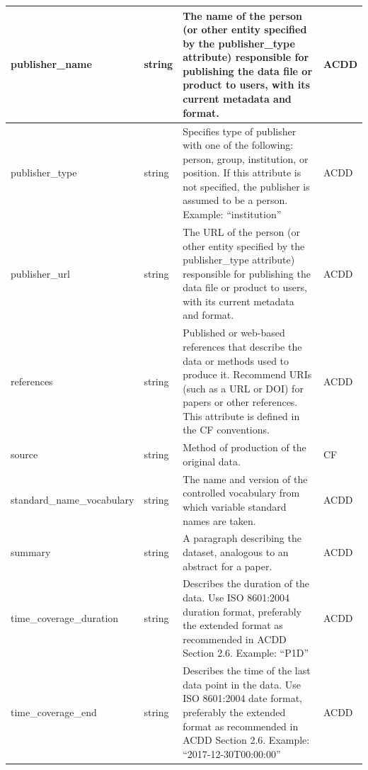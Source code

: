 \begin{longtable}{|p{}|p{}|p{}|p{}|}
\rowcolor{cyan!25} 
publisher\_name & string & The name of the person (or other entity specified by the publisher\_type attribute) responsible for publishing the data file or product to users, with its current metadata and format. & ACDD \\ \hline

\rowcolor{cyan!25} 
publisher\_type & string & Specifies type of publisher with one of the following: person, group, institution, or position. If this attribute is not specified, the publisher is assumed to be a person.  Example: “institution” & ACDD \\ \hline

\rowcolor{cyan!25} 
publisher\_url & string & The URL of the person (or other entity specified by the publisher\_type attribute) responsible for publishing the data file or product to users, with its current metadata and format. & ACDD \\ \hline

\rowcolor{cyan!25} 
references & string & Published or web-based references that describe the data or methods used to produce it. Recommend URIs (such as a URL or DOI) for papers or other references. This attribute is defined in the CF conventions. & ACDD \\ \hline

\rowcolor{cyan!25} 
source & string & Method of production of the original data. & CF \\ \hline

\rowcolor{cyan!25} 
standard\_name\_vocabulary & string & The name and version of the controlled vocabulary from which variable standard names are taken. & ACDD \\ \hline

\rowcolor{cyan!25} 
summary & string & A paragraph describing the dataset, analogous to an abstract for a paper. & ACDD \\ \hline

\rowcolor{cyan!25} 
time\_coverage\_duration & string & Describes the duration of the data. Use ISO 8601:2004 duration format, preferably the extended format as recommended in ACDD Section 2.6.  Example: “P1D” & ACDD \\ \hline

\rowcolor{cyan!25} 
time\_coverage\_end & string & Describes the time of the last data point in the data. Use ISO 8601:2004 date format, preferably the extended format as recommended in ACDD Section 2.6.  Example: “2017-12-30T00:00:00” & ACDD \\ \hline


\end{longtable}
